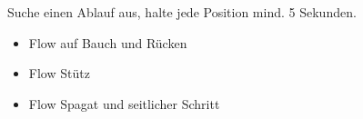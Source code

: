 Suche einen Ablauf aus, halte jede Position mind. 5 Sekunden.
\begin{itemize}
    \item Flow auf Bauch und Rücken
    \item Flow Stütz
    \item Flow Spagat und seitlicher Schritt
\end{itemize}